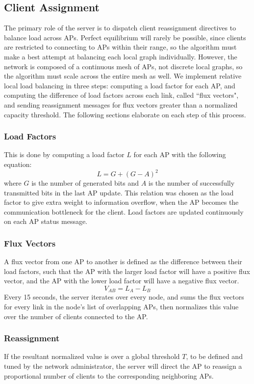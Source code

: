 \documentclass[10pt,journal,compsoc]{IEEEtran}
\begin{document}
		\subsection{Client Assignment}
		The primary role of the server is to dispatch client reassignment directives to balance load across APs. Perfect equilibrium will rarely be possible, since clients are restricted to connecting to APs within their range, so the algorithm must make a best attempt at balancing each local graph individually. However, the network is composed of a continuous mesh of APs, not discrete local graphs, so the algorithm must scale across the entire mesh as well. We implement relative local load balancing in three steps: computing a load factor for each AP, and computing the difference of load factors across each link, called ``flux vectors", and sending reassignment messages for flux vectors greater than a normalized capacity threshold. The following sections elaborate on each step of this process.
		
		\subsubsection{Load Factors}
		This is done by computing a load factor \(L\) for each AP with the following equation:
		\[L = G + (G-A)^2\]
		where \(G\) is the number of generated bits and \(A\) is the number of successfully transmitted bits in the last AP update. This relation was chosen as the load factor to give extra weight to information overflow, when the AP becomes the communication bottleneck for the client. Load factors are updated continuously on each AP status message.
		
		\subsubsection{Flux Vectors}
		A flux vector from one AP to another is defined as the difference between their load factors, such that the AP with the larger load factor will have a positive flux vector, and the AP with the lower load factor will have a negative flux vector.
		\[V_{AB} = L_A - L_B\]
		Every 15 seconds, the server iterates over every node, and sums the flux vectors for every link in the node's list of overlapping APs, then normalizes this value over the number of clients connected to the AP. 
		
		\subsubsection{Reassignment}
		If the resultant normalized value is over a global threshold \(T\), to be defined and tuned by the network administrator, the server will direct the AP to reassign a proportional number of clients to the corresponding neighboring APs.
		
\end{document}

